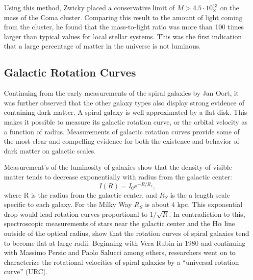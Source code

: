 Using this method, Zwicky placed a conservative limit of $M > 4.5 \cdot 10^{13}_{\odot}$ on the mass of the Coma cluster. Comparing this result to the amount of light coming from the cluster, he found that the mass-to-light ratio was more than 100 times larger than typical values for local stellar systems. This was the first indication that a large percentage of matter in the universe is not luminous\cite{zwicky}.

\subsection{Galactic Rotation Curves}
Continuing from the early measurements of the spiral galaxies by Jan Oort, it was further observed that the other galaxy types also display strong evidence of containing dark matter\cite{persic}.  A spiral galaxy is well approximated by a flat disk. This makes it possible to measure its galactic rotation curve, or the orbital velocity as a function of radius. Measurements of galactic rotation curves provide some of the most clear and compelling evidence for both the existence and behavior of dark matter on galactic scales.

Measurement's of the luminosity of galaxies show that the density of visible matter tends to decrease exponentially with radius from the galactic center:
\begin{equation}\label{eq:luminosity}
I(R)=I_{0}e^{-R/R_{s}},
\end{equation}
where R is the radius from the galactic center, and $R_{S}$ is the a length scale specific to each galaxy. For the Milky Way $R_{S}$ is about 4 kpc\cite{ryden}. This exponential drop would lead rotation curves proportional to $1/\sqrt{R}$. In contradiction to this, spectroscopic measurements of stars near the galactic center and the H$\alpha$ line outside of the optical radius, show that the rotation curves of spiral galaxies tend to become flat at large radii\cite{rubin, persic}. Beginning with Vera Rubin in 1980 \cite{rubin} and continuing with Massimo Persic and Paolo Salucci \cite{persic} among others, researchers went on to characterize the rotational velocities of spiral galaxies by a ``universal rotation curve'' (URC). 

